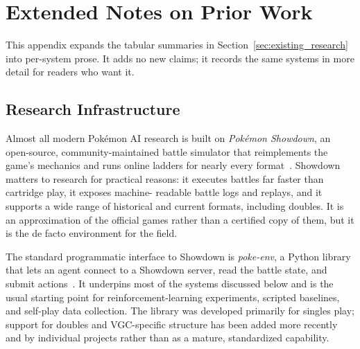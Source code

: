 
\clearpage
\appendix

\section{Extended Notes on Prior Work}
\label{sec:appendix_prior_work}

This appendix expands the tabular summaries in
Section~\ref{sec:existing_research} into per-system prose. It adds no new
claims; it records the same systems in more detail for readers who want it.

\subsection{Research Infrastructure}
\label{subsec:app_infrastructure}

Almost all modern Pok\'{e}mon AI research is built on \emph{Pok\'{e}mon
Showdown}, an open-source, community-maintained battle simulator that
reimplements the game's mechanics and runs online ladders for nearly every
format~\cite{pokemon_showdown}. Showdown matters to research for practical
reasons: it executes battles far faster than cartridge play, it exposes machine-
readable battle logs and replays, and it supports a wide range of historical and
current formats, including doubles. It is an approximation of the official games
rather than a certified copy of them, but it is the de facto environment for the
field.

The standard programmatic interface to Showdown is \emph{poke-env}, a Python
library that lets an agent connect to a Showdown server, read the battle state,
and submit actions~\cite{poke_env}. It underpins most of the systems discussed
below and is the usual starting point for reinforcement-learning experiments,
scripted baselines, and self-play data collection. The library was developed
primarily for singles play; support for doubles and VGC-specific structure has
been added more recently and by individual projects rather than as a mature,
standardized capability.

